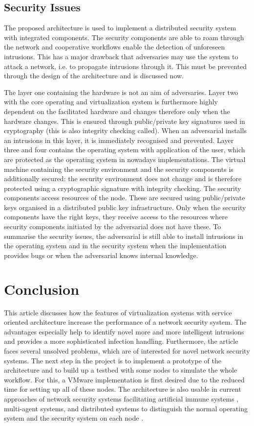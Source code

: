 \documentclass[conference,10pt,a4]{IEEEtran}
\begin{document}
\subsection{Security Issues}
The proposed architecture is used to implement a distributed security system with integrated components. The security components are able to roam through the network and cooperative workflows enable the detection of unforeseen intrusions. This has a major drawback that adversaries may use the system to attack a network, i.e. to propagate intrusions through it. This must be prevented through the design of the architecture and is discussed now.

The layer one containing the hardware is not an aim of adversaries. Layer two with the core operating and virtualization system is furthermore highly dependent on the facilitated hardware and changes therefore only when the hardware changes. This is ensured through public/private key signatures used in cryptography (this is also integrity checking called). When an adversarial installs an intrusions in this layer, it is immediately recognised and prevented. Layer three and four contains the operating system with application of the user, which are protected as the operating system in nowadays implementations. The virtual machine containing the security environment and the security components is additionally secured: the security environment does not change and is therefore protected using a cryptographic signature with integrity checking. The security components access resources of the node. These are secured using public/private keys organised in a distributed public key infrastructure. Only when the security components have the right keys, they receive access to the resources where security components initiated by the adversarial does not have these. To summarise the security issues, the adversarial is still able to install intrusions in the operating system and in the security system when the implementation provides bugs or when the adversarial knows internal knowledge. 

\section{Conclusion}
\label{secConclusion}
This article discusses how the features of virtualization systems with service oriented architecture increase the performance of a network security system. The advantages especially help to identify novel more and more intelligent intrusions and provides a more sophisticated infection handling. Furthermore, the article faces several unsolved problems, which are of interested for novel network security systems. The next step in the project is to implement a prototype of the architecture and to build up a testbed with some nodes to simulate the whole workflow. For this, a VMware implementation is first desired due to the reduced time for setting up all of these nodes. The architecture is also usable in current approaches of network security systems facilitating artificial immune systems \cite{Hil06b}, multi-agent systems, and distributed systems to distinguish the normal operating system and the security system on each node \cite{Spa00}.
\end{document}
